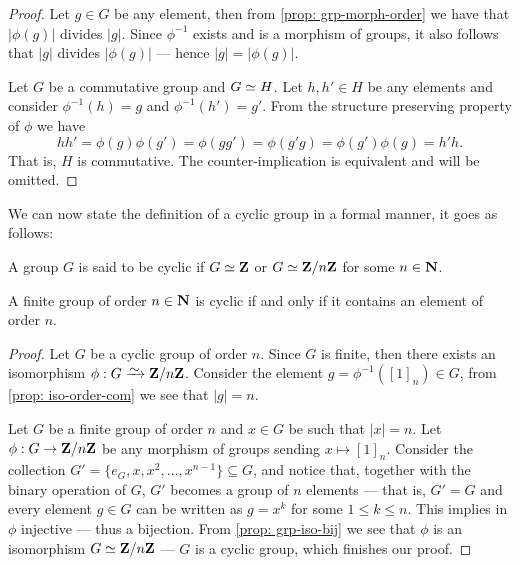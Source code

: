\begin{proof}
  Let \(g \in G\) be any element, then from \cref{prop: grp-morph-order} we have
  that \(|\phi(g)|\) divides \(|g|\). Since \(\phi^{-1}\) exists and is a
  morphism of groups, it also follows that \(|g|\) divides \(|\phi(g)|\) ---
  hence \(|g| = |\phi(g)|\).

  Let \(G\) be a commutative group and \(G \simeq H\). Let \(h, h' \in H\) be any
  elements and consider \(\phi^{-1}(h) = g\) and \(\phi^{-1}(h') = g'\). From
  the structure preserving property of \(\phi\) we have
  \[
    h h' = \phi(g) \phi(g') = \phi(gg') = \phi(g'g) = \phi(g')\phi(g) = h' h.
  \]
  That is, \(H\) is commutative. The counter-implication is equivalent and will
  be omitted.
\end{proof}

We can now state the definition of a cyclic group in a formal manner, it goes as
follows:

\begin{definition}\label{def: cyclic-grp}
  A group \(G\) is said to be cyclic if \(G \simeq \mathbf{Z}\) or \(G \simeq \mathbf{Z}/n\mathbf{Z}\) for
  some \(n \in \mathbf{N}\).
\end{definition}

\begin{proposition}
  A finite group of order \(n \in \mathbf{N}\) is cyclic if and only if it contains an
  element of order \(n\).
\end{proposition}

\begin{proof}
  Let \(G\) be a cyclic group of order \(n\). Since \(G\) is finite, then there
  exists an isomorphism \(\phi: G \isoto \Z/n\Z\). Consider the element \(g =
  \phi^{-1}([1]_n) \in G\), from \cref{prop: iso-order-com} we see that \(|g| =
  n\).

  Let \(G\) be a finite group of order \(n\) and \(x \in G\) be such that \(|x|
  = n\). Let \(\phi: G \to \mathbf{Z}/n\mathbf{Z}\) be any morphism of groups sending \(x
  \mapsto [1]_n\). Consider the collection \(G' = \{e_G, x, x^2, \dots,
  x^{n-1}\} \subseteq G\), and notice that, together with the binary operation
  of \(G\), \(G'\) becomes a group of \(n\) elements --- that is, \(G' = G\) and
  every element \(g \in G\) can be written as \(g = x^k\) for some \(1 \leq k
  \leq n\). This implies in \(\phi\) injective --- thus a bijection. From
  \cref{prop: grp-iso-bij} we see that \(\phi\) is an isomorphism \(G \simeq
  \mathbf{Z}/n\mathbf{Z}\) --- \(G\) is a cyclic group, which finishes our proof.
\end{proof}

